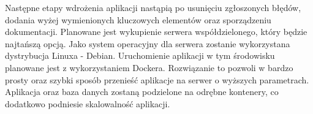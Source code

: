 Następne etapy wdrożenia aplikacji nastąpią po usunięciu zgłoszonych błędów, dodania wyżej wymienionych kluczowych elementów oraz sporządzeniu dokumentacji. Planowane jest wykupienie serwera współdzielonego, który będzie najtańszą opcją. Jako system operacyjny dla serwera zostanie wykorzystana dystrybucja Linuxa - Debian. Uruchomienie aplikacji w tym środowisku planowane jest z wykorzystaniem Dockera. Rozwiązanie to pozwoli w bardzo prosty oraz szybki sposób przenieść aplikacje na serwer o wyższych parametrach. Aplikacja oraz baza danych zostaną podzielone na odrębne kontenery, co dodatkowo podniesie skalowalność aplikacji.   
